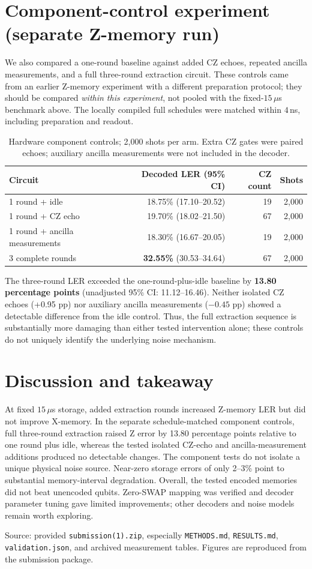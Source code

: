 \documentclass[9pt,letterpaper]{article}
\begin{document}
\section*{Component-control experiment (separate Z-memory run)}
We also compared a one-round baseline against added CZ echoes, repeated ancilla measurements, and a full three-round extraction circuit. These controls came from an earlier Z-memory experiment with a different preparation protocol; they should be compared \emph{within this experiment}, not pooled with the fixed-$15\,\mu$s benchmark above. The locally compiled full schedules were matched within $4\,$ns, including preparation and readout.
\begin{table}[h]
\centering\small
\begin{tabular}{lrrr}
\toprule
\textbf{Circuit} & \textbf{Decoded LER (95\% CI)} & \textbf{CZ count} & \textbf{Shots}\\
\midrule
1 round + idle & 18.75\% (17.10--20.52) & 19 & 2,000\\
1 round + CZ echo & 19.70\% (18.02--21.50) & 67 & 2,000\\
1 round + ancilla measurements & 18.30\% (16.67--20.05) & 19 & 2,000\\
3 complete rounds & \textbf{32.55\%} (30.53--34.64) & 67 & 2,000\\
\bottomrule
\end{tabular}
\caption{Hardware component controls; 2,000 shots per arm. Extra CZ gates were paired echoes; auxiliary ancilla measurements were not included in the decoder.}
\end{table}
The three-round LER exceeded the one-round-plus-idle baseline by \textbf{13.80 percentage points} (unadjusted 95\% CI: 11.12--16.46). Neither isolated CZ echoes (+0.95 pp) nor auxiliary ancilla measurements ($-0.45$ pp) showed a detectable difference from the idle control. Thus, the full extraction sequence is substantially more damaging than either tested intervention alone; these controls do not uniquely identify the underlying noise mechanism.

\section*{Discussion and takeaway}
At fixed $15\,\mu$s storage, added extraction rounds increased Z-memory LER but did not improve X-memory. In the separate schedule-matched component controls, full three-round extraction raised Z error by 13.80 percentage points relative to one round plus idle, whereas the tested isolated CZ-echo and ancilla-measurement additions produced no detectable changes. The component tests do not isolate a unique physical noise source. Near-zero storage errors of only 2--3\% point to substantial memory-interval degradation. Overall, the tested encoded memories did not beat unencoded qubits. Zero-SWAP mapping was verified and decoder parameter tuning gave limited improvements; other decoders and noise models remain worth exploring.

\vfill
{\footnotesize\color{gray}Source: provided \texttt{submission(1).zip}, especially \texttt{METHODS.md}, \texttt{RESULTS.md}, \texttt{validation.json}, and archived measurement tables. Figures are reproduced from the submission package.}
\end{document}
